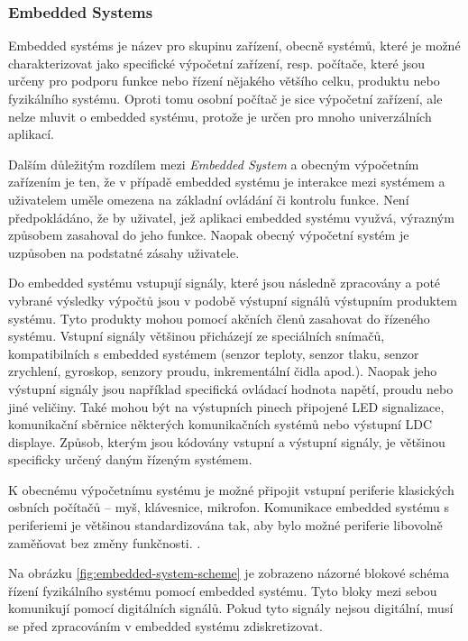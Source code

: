 \documentclass[a4paper, twoside, 11pt]{article}
\begin{document}
	\subsubsection{Embedded Systems}
	Embedded systéms je název pro skupinu zařízení, obecně systémů, které je možné charakterizovat jako specifické výpočetní zařízení, resp. počítače, které jsou určeny pro podporu funkce nebo řízení nějakého většího celku, produktu nebo fyzikálního systému. Oproti tomu osobní počítač je sice výpočetní zařízení, ale nelze mluvit o embedded systému, protože je určen pro mnoho univerzálních aplikací. \cite{Sass2010}\par
	Dalším důležitým rozdílem mezi \textit{Embedded System} a obecným výpočetním zařízením je ten, že v případě embedded systému je interakce mezi systémem a uživatelem uměle omezena na základní ovládání či kontrolu funkce. Není předpokládáno, že by uživatel, jež aplikaci embedded systému využvá, výrazným způsobem zasahoval do jeho funkce. Naopak obecný výpočetní systém je uzpůsoben na podstatné zásahy uživatele. \cite{Sass2010} \cite{juan-fpgas}\par
	Do embedded systému vstupují signály, které jsou následně zpracovány a poté vybrané výsledky výpočtů jsou v podobě výstupní signálů výstupním produktem systému. Tyto produkty mohou pomocí akčních členů zasahovat do řízeného systému. Vstupní signály většinou přicházejí ze speciálních snímačů, kompatibilních s embedded systémem (senzor teploty, senzor tlaku, senzor zrychlení, gyroskop, senzory proudu, inkrementální čidla apod.). Naopak jeho výstupní signály jsou například specifická ovládací hodnota napětí, proudu nebo jiné veličiny. Také mohou být na výstupních pinech připojené LED signalizace, komunikační sběrnice některých komunikačních systémů nebo výstupní LDC displaye. Způsob, kterým jsou kódovány vstupní a výstupní signály, je většinou specificky určený daným řízeným systémem. \cite{Sass2010}\par
	K obecnému výpočetnímu systému je možné připojit vstupní periferie klasických osbních počítačů – myš, klávesnice, mikrofon. Komunikace embedded systému s periferiemi je většinou standardizována tak, aby bylo možné periferie libovolně zaměňovat bez změny funkčnosti. \cite{Sass2010}.\par
	Na obrázku \ref{fig:embedded-system-scheme} je zobrazeno názorné blokové schéma řízení fyzikálního systému pomocí embedded systému. Tyto bloky mezi sebou komunikují pomocí digitálních signálů. Pokud tyto signály nejsou digitální, musí se před zpracováním v embedded systému zdiskretizovat.
\end{document}
